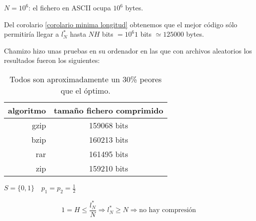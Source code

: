 	\begin{example}



		$N = 10^6$: el fichero en ASCII ocupa $10^6$ bytes.

		Del corolario \ref{corolario minima longitud} obtenemos que el mejor código sólo permitiría llegar a $l^*_N$ hasta $NH$ bits $= 10^6 1$ bits $\simeq 125000$ bytes.

		Chamizo hizo unas pruebas en su ordenador en las que con archivos aleatorios los resultados fueron los siguientes:


		\begin{table}[h]
			\centering
			\begin{tabular}{r|c}
			algoritmo & tamaño fichero comprimido \\ \hline
			gzip & 159068 bits \\
			bzip & 160213 bits \\
			rar & 161495 bits \\
			zip & 159210 bits
			\end{tabular}
			\caption{Todos son aproximadamente un 30\% peores que el óptimo.}
		\end{table}



	\end{example}


	\begin{example}

		$S = \{0,1\} \quad p_1 = p_2 = \frac{1}{2}$

		$$ 1 = H \leq \frac{l^*_N}{N} \Rightarrow l^*_N \geq N \Rightarrow \text{no hay compresión} $$

	\end{example}

